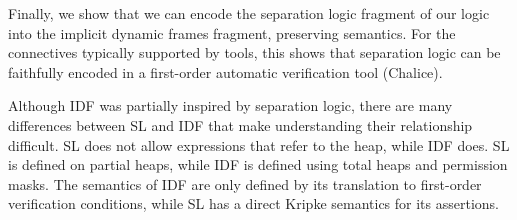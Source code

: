 Finally, we show that we can encode the separation
logic fragment of our logic into the implicit dynamic frames fragment, preserving
semantics. For the connectives typically supported by tools, this shows that separation
logic can be faithfully encoded in a first-order automatic verification tool (Chalice).

Although IDF was partially inspired by separation logic, there are many differences
between SL and IDF that make understanding their relationship difficult. SL does not
allow expressions that refer to the heap, while IDF does. SL is defined on partial heaps,
while IDF is defined using total heaps and permission masks. The semantics of IDF are only defined by its translation to first-order verification conditions, while SL has a direct
Kripke semantics for its assertions.

